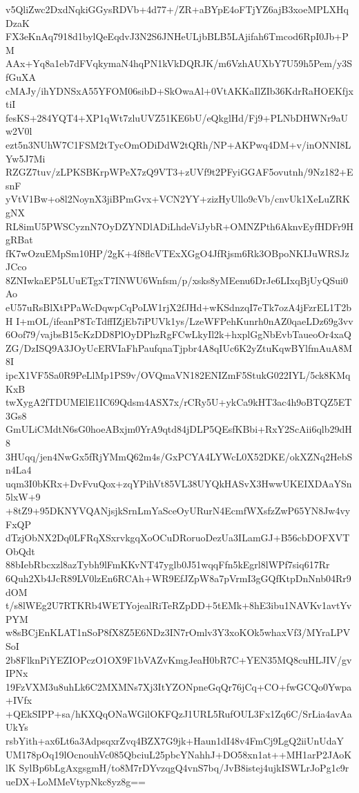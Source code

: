 v5QliZwc2DxdNqkiGGysRDVb+4d77+/ZR+aBYpE4oFTjYZ6ajB3xoeMPLXHqDzaK
FX3eKnAq7918d1bylQeEqdvJ3N2S6JNHeULjbBLB5LAjifah6Tmcod6RpI0Jb+PM
AAx+Yq8a1eb7dFVqkymaN4hqPN1kVkDQRJK/m6VzhAUXbY7U59h5Pem/y3SfGuXA
cMAJy/ihYDNSxA55YFOM06sibD+SkOwaAl+0VtAKKaIlZIb36KdrRaHOEKfjxtiI
fesKS+284YQT4+XP1qWt7zluUVZ51KE6bU/eQkglHd/Fj9+PLNbDHWNr9aUw2V0l
ezt5n3NUhW7C1FSM2tTycOmODiDdW2tQRh/NP+AKPwq4DM+v/inONNI8LYw5J7Mi
RZGZ7tuv/zLPKSBKrpWPeX7zQ9VT3+zUVf9t2PFyiGGAF5ovutnh/9Nz182+EsnF
yVtV1Bw+o8l2NoynX3jiBPmGvx+VCN2YY+zizHyUllo9cVb/cnvUk1XeLuZRKgNX
RL8imU5PWSCyznN7OyDZYNDlADiLhdeViJybR+OMNZPth6AknvEyfHDFr9HgRBat
fK7wOzuEMpSm10HP/2gK+4f8flcVTExXGgO4JfRjsm6Rk3OBpoNKIJuWRSJzJCco
8ZNIwkaEP5LUuETgxT7INWU6Wnfsm/p/xsks8yMEenu6DrJe6LIxqBjUyQSui0Ao
eU57uRsBlXtPPaWcDqwpCqPoLW1rjX2fJHd+wKSdnzqI7eTk7ozA4jFzrEL1T2bH
I+mOL/ifeanP8TcTdffIZjEb7iPUVk1ys/LzeWFPehKunrh0nAZ0qaeLDz69g3vv
6Oof79/vajbsB15cKzDD8PlOyDPhzRgFCwLkyIl2k+hxplGgNbEvbTaueoOr4xaQ
ZG/DzISQ9A3JOyUcERVIaFhPaufqnaTjpbr4A8qIUc6K2yZtuKqwBYlfmAuA8M8I
ipcX1VF5Sa0R9PeLlMp1PS9v/OVQmaVN182ENIZmF5StukG022IYL/5ck8KMqKxB
twXygA2fTDUMElE1IC69Qdsm4ASX7x/rCRy5U+ykCa9kHT3ac4h9oBTQZ5ET3Gs8
GmULiCMdtN6sG0hoeABxjm0YrA9qtd84jDLP5QEsfKBbi+RxY2ScAii6qlb29dH8
3HUqq/jen4NwGx5fRjYMmQ62m4s/GxPCYA4LYWcL0X52DKE/okXZNq2HebSn4La4
uqm3I0bKRx+DvFvuQox+zqYPihVt85VL38UYQkHASvX3HwwUKEIXDAaYSn5lxW+9
+8tZ9+95DKNYVQANjsjkSrnLmYaSceOyURurN4EcmfWXsfzZwP65YN8Jw4vyFxQP
dTzjObNX2Dq0LFRqXSxrvkgqXoOCuDRoruoDezUa3ILamGJ+B56cbDOFXVTObQdt
88bIebRbcxzl8azTybh9lFmKKvNT47yglb0J51wqqFfn5kEgrl8lWPf7siq617Rr
6Quh2Xb4JcR89LV0lzEn6RCAh+WR9EfJZpW8a7pVrmI3gGQfKtpDnNnb04Rr9dOM
t/s8lWEg2U7RTKRb4WETYojealRiTeRZpDD+5tEMk+8hE3ibu1NAVKv1avtYvPYM
w8sBCjEnKLAT1nSoP8fX8Z5E6NDz3IN7rOmlv3Y3xoKOk5whaxVf3/MYraLPVSoI
2b8FlknPiYEZIOPczO1OX9F1bVAZvKmgJeaH0bR7C+YEN35MQ8cuHLJIV/gvIPNx
19FzVXM3u8uhLk6C2MXMNs7Xj3ItYZONpneGqQr76jCq+CO+fwGCQo0Ywpa+IVfx
+QEkSIPP+sa/hKXQqONaWGilOKFQzJ1URL5RufOUL3Fx1Zq6C/SrLia4avAaUkYs
rsbYith+ax6Lt6a3AdpsqxrZvq4BZX7G9jk+Haun1dI48v4FmCj9LgQ2iiUnUdaY
UM178pOq19lOcnouhVc085QbciuL25pbcYNahhJ+DO58xn1at++MH1arP2JAoKlK
SylBp6bLgAxgsgmH/to8M7rDYvzqgQ4vnS7bq/JvB8istej4ujkISWLrJoPg1c9r
ueDX+LoMMeVtypNkc8yz8g==
